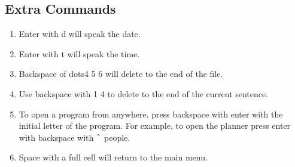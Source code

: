 \documentclass[10pt,letterpaper,twoside]{report}
\begin{document}
{{{\subsection{Extra Commands}
\begin{enumerate}
	\item Enter with d will speak the date.
	\item Enter with t will speak the time.
	\item Backspace of dots4 5 6 will delete to the end of the file.
	\item Use backspace with 1 4 to delete to the end of the current sentence.
	\item To open a program from anywhere, press backspace with enter with the initial letter of the program.  For example, to open the planner press enter with backspace with $ \string^ $ people.
	\item Space with a full cell will return to the main menu.
\end{enumerate}
\clearpage
}}}
\end{document}
